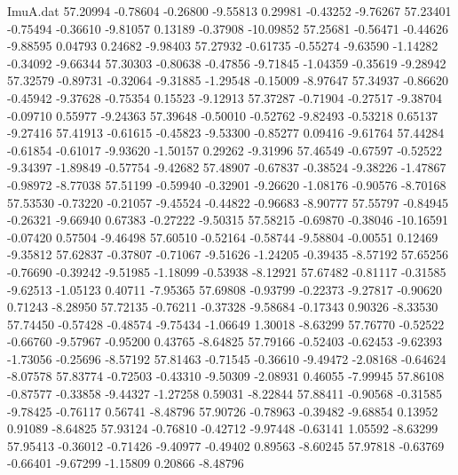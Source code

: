 \begin{filecontents}{ImuA.dat}
  57.20994   -0.78604   -0.26800   -9.55813    0.29981   -0.43252   -9.76267
  57.23401   -0.75494   -0.36610   -9.81057    0.13189   -0.37908  -10.09852
  57.25681   -0.56471   -0.44626   -9.88595    0.04793    0.24682   -9.98403
  57.27932   -0.61735   -0.55274   -9.63590   -1.14282   -0.34092   -9.66344
  57.30303   -0.80638   -0.47856   -9.71845   -1.04359   -0.35619   -9.28942
  57.32579   -0.89731   -0.32064   -9.31885   -1.29548   -0.15009   -8.97647
  57.34937   -0.86620   -0.45942   -9.37628   -0.75354    0.15523   -9.12913
  57.37287   -0.71904   -0.27517   -9.38704   -0.09710    0.55977   -9.24363
  57.39648   -0.50010   -0.52762   -9.82493   -0.53218    0.65137   -9.27416
  57.41913   -0.61615   -0.45823   -9.53300   -0.85277    0.09416   -9.61764
  57.44284   -0.61854   -0.61017   -9.93620   -1.50157    0.29262   -9.31996
  57.46549   -0.67597   -0.52522   -9.34397   -1.89849   -0.57754   -9.42682
  57.48907   -0.67837   -0.38524   -9.38226   -1.47867   -0.98972   -8.77038
  57.51199   -0.59940   -0.32901   -9.26620   -1.08176   -0.90576   -8.70168
  57.53530   -0.73220   -0.21057   -9.45524   -0.44822   -0.96683   -8.90777
  57.55797   -0.84945   -0.26321   -9.66940    0.67383   -0.27222   -9.50315
  57.58215   -0.69870   -0.38046  -10.16591   -0.07420    0.57504   -9.46498
  57.60510   -0.52164   -0.58744   -9.58804   -0.00551    0.12469   -9.35812
  57.62837   -0.37807   -0.71067   -9.51626   -1.24205   -0.39435   -8.57192
  57.65256   -0.76690   -0.39242   -9.51985   -1.18099   -0.53938   -8.12921
  57.67482   -0.81117   -0.31585   -9.62513   -1.05123    0.40711   -7.95365
  57.69808   -0.93799   -0.22373   -9.27817   -0.90620    0.71243   -8.28950
  57.72135   -0.76211   -0.37328   -9.58684   -0.17343    0.90326   -8.33530
  57.74450   -0.57428   -0.48574   -9.75434   -1.06649    1.30018   -8.63299
  57.76770   -0.52522   -0.66760   -9.57967   -0.95200    0.43765   -8.64825
  57.79166   -0.52403   -0.62453   -9.62393   -1.73056   -0.25696   -8.57192
  57.81463   -0.71545   -0.36610   -9.49472   -2.08168   -0.64624   -8.07578
  57.83774   -0.72503   -0.43310   -9.50309   -2.08931    0.46055   -7.99945
  57.86108   -0.87577   -0.33858   -9.44327   -1.27258    0.59031   -8.22844
  57.88411   -0.90568   -0.31585   -9.78425   -0.76117    0.56741   -8.48796
  57.90726   -0.78963   -0.39482   -9.68854    0.13952    0.91089   -8.64825
  57.93124   -0.76810   -0.42712   -9.97448   -0.63141    1.05592   -8.63299
  57.95413   -0.36012   -0.71426   -9.40977   -0.49402    0.89563   -8.60245
  57.97818   -0.63769   -0.66401   -9.67299   -1.15809    0.20866   -8.48796

\end{filecontents}
